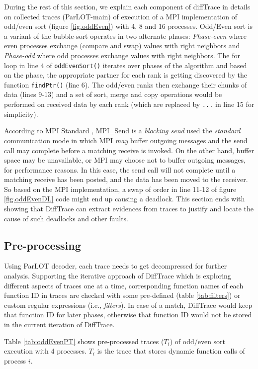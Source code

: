 %
During the rest of this section, we explain each component of diffTrace in details on collected traces (ParLOT-main) of execution of a MPI implementation of odd/even sort (figure \ref{fig.oddEven}) with 4, 8 and 16 processes. 
Odd/Even sort is a variant of the bubble-sort operates in two alternate phases: \textit{Phase-even} where even processes exchange (compare and swap) values with right neighbors and \textit{Phase-odd} where odd processes exchange values with right neighbors. The for loop in line 4 of \texttt{oddEvenSort()} iterates over phases of the algorithm and based on the phase, the appropriate partner for each rank is getting discovered by the function \texttt{findPtr()} (line 6). The odd/even ranks then exchange their chunks of data (lines 9-13) and a set of sort, merge and copy operations would be performed on received data by each rank (which are replaced by \texttt{...} in line 15 for simplicity).

According to MPI Standard , MPI\_Send is a \textit{blocking send} used the \textit{standard} communication mode in which MPI \textit{may} buffer outgoing messages and the send call may complete before a matching receive is invoked. On the other hand, buffer space may be unavailable, or MPI may choose not to buffer outgoing messages, for performance reasons. In this case, the send call will not complete until a matching receive has been posted, and the data has been moved to the receiver. So based on the MPI implementation, a swap of order in line 11-12 of figure \ref{fig.oddEvenDL} code might end up causing a deadlock. This section ends with showing that DiffTrace can extract evidences from traces to justify and locate the cause of such deadlocks and other faults.


\subsection{Pre-processing}

Using ParLOT decoder, each trace needs to get decompressed for further analysis.
Supporting the iterative approach of DiffTrace which is exploring different aspects of traces one at a time, corresponding function names of each function ID in traces are checked with some pre-defined (table \ref{tab:filters}) or custom regular expressions (i.e., \textit{filters}). In case of a match, DiffTrace would keep that function ID for later phases, otherwise that function ID would not be stored in the current iteration of DiffTrace.

Table \ref{tab:oddEvenPT} shows pre-processed traces ($T_i$) of odd/even sort execution with 4 processes. $T_i$ is the trace that stores dynamic function calls of process $i$.



